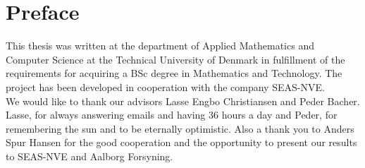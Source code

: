\chapter{Preface}
This thesis was written at the department of Applied Mathematics and Computer Science at the Technical University of Denmark in fulfillment of the requirements for acquiring a BSc degree in Mathematics and Technology. The project has been developed in cooperation with the company SEAS-NVE. \\

\noindent We would like to thank our advisors Lasse Engbo Christiansen and Peder Bacher. Lasse, for always answering emails and having 36 hours a day and Peder, for remembering the sun and to be eternally optimistic. Also a thank you to Anders Spur Hansen for the good cooperation and the opportunity to present our results to SEAS-NVE and Aalborg Forsyning. 

\vfill

{
\begin{flushright}
    \thesisauthor{}
\end{flushright}
}